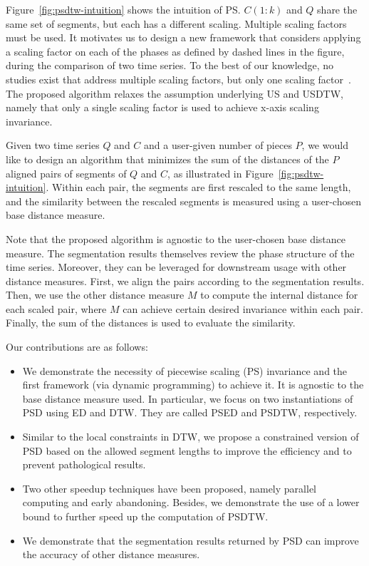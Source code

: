 
Figure~\ref{fig:psdtw-intuition} shows the intuition of PS.
$C(1:k)$ and $Q$ share the same set of segments, but each has a different scaling.
Multiple scaling factors must be used.
It motivates us to design a new framework that considers applying a scaling factor on each of the phases as defined by dashed lines in the figure, during the comparison of two time series.
To the best of our knowledge, no studies exist that address multiple scaling factors, but only one scaling factor~\cite{keogh2004indexing, fu2008scaling, shen2017searching, shen2018accelerating}.
The proposed algorithm relaxes the assumption underlying US and USDTW, namely that only a single scaling factor is used to achieve x-axis scaling invariance.

\noindent{} Given two time series $Q$ and $C$ and a user-given number of pieces $P$, we would like to design an algorithm that minimizes the sum of the distances of the $P$ aligned pairs of segments of $Q$ and $C$, as illustrated in Figure~\ref{fig:psdtw-intuition}. 
Within each pair, the segments are first rescaled to the same length, and the similarity between the rescaled segments is measured using a user-chosen base distance measure.

Note that the proposed algorithm is agnostic to the user-chosen base distance measure.
The segmentation results themselves review the phase structure of the time series. 
Moreover, they can be leveraged for downstream usage with other distance measures. 
First, we align the pairs according to the segmentation results.
Then, we use the other distance measure $M$ to compute the internal distance for each scaled pair, where $M$ can achieve certain desired invariance within each pair.
Finally, the sum of the distances is used to evaluate the similarity.

Our contributions are as follows:
\begin{itemize}
  \item We demonstrate the necessity of piecewise scaling (PS) invariance and the first framework (via dynamic programming) to achieve it. 
  It is agnostic to the base distance measure used.
  In particular, we focus on two instantiations of PSD using ED and DTW.
  They are called PSED and PSDTW, respectively.
  \item Similar to the local constraints in DTW, we propose a constrained version of PSD based on the allowed segment lengths to improve the efficiency and to prevent pathological results. 
  \item Two other speedup techniques have been proposed, namely parallel computing and early abandoning. 
  Besides, we demonstrate the use of a lower bound to further speed up the computation of PSDTW.
  \item We demonstrate that the segmentation results returned by PSD can improve the accuracy of other distance measures.
\end{itemize}

